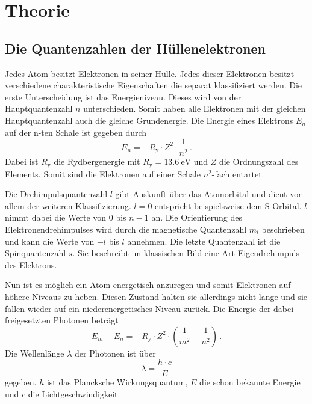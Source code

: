 \section{Theorie}
\label{sec:Theorie}

\subsection{Die Quantenzahlen der Hüllenelektronen}
\label{ssec:theo1}

Jedes Atom besitzt Elektronen in seiner Hülle. Jedes dieser Elektronen besitzt verschiedene charakteristische Eigenschaften die separat klassifiziert werden. 
Die erste Unterscheidung ist das Energieniveau. Dieses wird von der Hauptquantenzahl $n$ unterschieden.
Somit haben alle Elektronen mit der gleichen Hauptquantenzahl auch die gleiche Grundenergie.
Die Energie eines Elektrons $E_n$ auf der n-ten Schale ist gegeben durch
\begin{equation}
    E_n = - R_\text{y} \cdot Z^2 \cdot \frac{1}{n^2} \, .
    \label{eq:n}
\end{equation}
Dabei ist $R_\text{y}$ die Rydbergenergie mit $ R_\text{y} = \SI{13.6}{\electronvolt}$ und $Z$ die Ordnungszahl des Elements.
Somit sind die Elektronen auf einer Schale $n^2$-fach entartet.

Die Drehimpulsquantenzahl $l$ gibt Auskunft über das Atomorbital und dient vor allem der weiteren Klassifizierung.
$l = 0$ entspricht beispielsweise dem S-Orbital.
$l$ nimmt dabei die Werte von $0$ bis $ n - 1 $ an. 
Die Orientierung des Elektronendrehimpulses wird durch die magnetische Quantenzahl $m_l$ beschrieben und kann die Werte von $- l $ bis $ l $ annehmen.
Die letzte Quantenzahl ist die Spinquantenzahl $s$. 
Sie beschreibt im klassischen Bild eine Art Eigendrehimpuls des Elektrons.

Nun ist es möglich ein Atom energetisch anzuregen und somit Elektronen auf höhere Niveaus zu heben.
Diesen Zustand halten sie allerdings nicht lange und sie fallen wieder auf ein niederenergetisches Niveau zurück.
Die Energie der dabei freigesetzten Photonen beträgt 
\begin{equation}
    E_m - E_n = - R_\text{y} \cdot Z^2 \cdot \left( \frac{1}{m^2} - \frac{1}{n^2} \right) \, .
    \label{eq:energiediff}
\end{equation}
Die Wellenlänge $\lambda$ der Photonen ist über
\begin{equation}
     \lambda = \frac{h \cdot c}{E}
    \label{eq:wellenl}
\end{equation}
gegeben. $h$ ist das Plancksche Wirkungsquantum, $E$ die schon bekannte Energie und $c$ die Lichtgeschwindigkeit.


